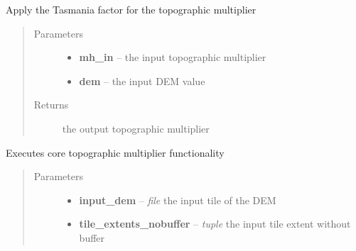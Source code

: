 \documentclass[letterpaper,10pt,english]{sphinxmanual}
\begin{document}

\begin{fulllineitems}
\label{docs/topographic:topomult.tasmania}
Apply the Tasmania factor for the topographic multiplier
\begin{quote}\begin{description}
\item[{Parameters}] \leavevmode\begin{itemize}
\item {} 
\textbf{mh\_in} --  the input topographic multiplier

\item {} 
\textbf{dem} --  the input DEM value

\end{itemize}

\item[{Returns}] \leavevmode
{} the output topographic multiplier

\end{description}\end{quote}

\end{fulllineitems}



\begin{fulllineitems}
\label{docs/topographic:topomult.topomult}
Executes core topographic multiplier functionality
\begin{quote}\begin{description}
\item[{Parameters}] \leavevmode\begin{itemize}
\item {} 
\textbf{input\_dem} -- \emph{file} the input tile of the DEM

\item {} 
\textbf{tile\_extents\_nobuffer} -- \emph{tuple} the input tile extent without buffer

\end{itemize}

\end{description}\end{quote}

\end{fulllineitems}
\end{document}
